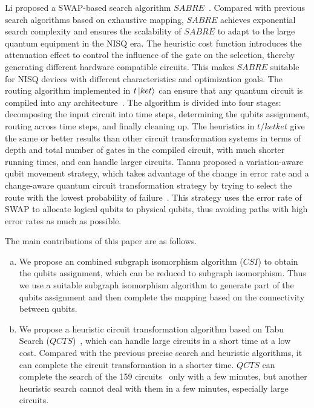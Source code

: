 \documentclass[runningheads]{llncs}
\begin{document}
\begin{enumerate}[1)]
	Li proposed a SWAP-based search algorithm $SABRE$~\cite{Li2018}. Compared with previous search algorithms based on exhaustive mapping, $SABRE$ achieves exponential search complexity and ensures the scalability of $SABRE$ to adapt to the large quantum equipment in the NISQ era. The heuristic cost function introduces the attenuation effect to control the influence of the gate on the selection, thereby generating different hardware compatible circuits. This makes $SABRE$ suitable for NISQ devices with different characteristics and optimization goals. The routing algorithm implemented in $t\left\vert{ket}\right\rangle$ can ensure that any quantum circuit is compiled into any architecture~\cite{Cowtan2019}. The algorithm is divided into four stages: decomposing the input circuit into time steps, determining the qubits assignment, routing across time steps, and finally cleaning up. The heuristics in $t/ket{ket}$ give the same or better results than other circuit transformation systems in terms of depth and total number of gates in the compiled circuit, with much shorter running times, and can handle larger circuits. Tannu proposed a variation-aware qubit movement strategy, which takes advantage of the change in error rate and a change-aware quantum circuit transformation strategy by trying to select the route with the lowest probability of failure~\cite{Tannu2019}. This strategy uses the error rate of SWAP to allocate logical qubits to physical qubits, thus avoiding paths with high error rates as much as possible.
\end{enumerate} 

The main contributions of this paper are as follows.
	\begin{enumerate}[a.]
		\item We propose an combined subgraph isomorphism algorithm ($CSI$) to obtain the qubits assignment, which can be reduced to subgraph isomorphism. Thus we use a suitable subgraph isomorphism algorithm to generate part of the qubits assignment and then complete the mapping based on the connectivity between qubits.
		\item We propose a heuristic circuit transformation algorithm based on Tabu Search ($QCTS$)~\cite{Glover1990}, which can handle large circuits in a short time at a low cost. Compared with the previous precise search and heuristic algorithms, it can complete the circuit transformation in a shorter time. $QCTS$ can complete the search of the 159 circuits~\cite{Zulehner2017} only with a few minutes, but another heuristic search cannot deal with them in a few minutes, especially large circuits.
	\end{enumerate}
\end{document}
